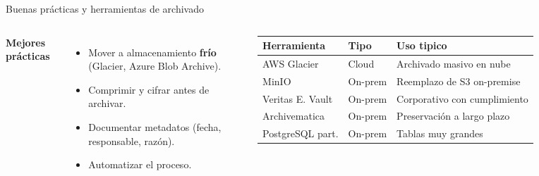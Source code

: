 \documentclass[aspectratio=169]{beamer}
\begin{document}
\begin{frame}{Buenas pr\'acticas y herramientas de archivado}
  \begin{columns}[t]
      \textbf{Mejores pr\'acticas}
      \begin{itemize}
        \item Mover a almacenamiento \textbf{fr\'io} (Glacier, Azure Blob
              Archive).
        \item Comprimir y cifrar antes de archivar.
        \item Documentar metadatos (fecha, responsable, raz\'on).
        \item Automatizar el proceso.
      \end{itemize}
      \scriptsize
      \begin{tabular}{p{2.2cm} p{1.6cm} p{2.6cm}}
        \textbf{Herramienta} & \textbf{Tipo} & \textbf{Uso tipico}\\[2pt]
        \hline
        AWS Glacier & Cloud & Archivado masivo en nube\\[2pt]
        MinIO & On-prem & Reemplazo de S3 on-premise\\[2pt]
        Veritas E. Vault & On-prem & Corporativo con cumplimiento\\[2pt]
        Archivematica & On-prem & Preservaci\'on a largo plazo\\[2pt]
        PostgreSQL part. & On-prem & Tablas muy grandes\\
        \hline
      \end{tabular}
  \end{columns}
\end{frame}
\end{document}
